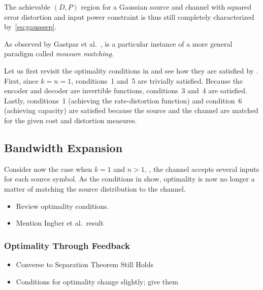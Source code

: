 The achievable $(D,P)$ region for a Gaussian source and channel with squared
error distortion and input power constraint is thus still completely
characterized by~\eqref{eq:gausssep}.

As observed by Gastpar et al.~\cite{GastparRV2003},  is a
particular instance of a more general paradigm called \emph{measure matching}. 


Let us first revisit the optimality conditions in  and see
how they are satisfied by . First, since $k = n = 1$,
conditions~1 and~5 are trivially satisfied. Because the encoder and decoder are
invertible functions, conditions~3 and~4 are satisfied. Lastly, conditions~1
(achieving the rate-distortion function) and condition~6 (achieving capacity)
are satisfied because the source and the channel are matched for the given cost
and distortion measures. 


\subsection{Bandwidth Expansion}

Consider now the case when $k = 1$ and $n > 1$, \ie, the channel accepts several
inputs for each source symbol. As the conditions in  show,
optimality is now no longer a matter of matching the source distribution to the
channel. 

\begin{itemize}
  \item Review optimality conditions. 
  \item Mention Ingber et al.\ result
\end{itemize}

\subsubsection{Optimality Through Feedback}

\begin{itemize}
  \item Converse to Separation Theorem Still Holds
  \item Conditions for optimality change slightly; give them
\end{itemize}

